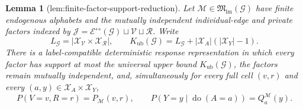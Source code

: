 \documentclass{article}
\newtheorem{lemma}{Lemma}
\begin{document}
\begin{lemma}[lem:finite-factor-support-reduction]\label{lem:finite-factor-support-reduction}
Let \(\mathcal M\in\mathfrak M_{\mathrm{lm}}(\mathcal G)\) have finite endogenous alphabets and the mutually independent individual-edge and private factors indexed by \(\mathcal J=\mathcal E^{\leftrightarrow}(\mathcal G)\sqcup\mathcal V\sqcup\mathcal R\). Write
\[
L_{\mathcal G}=\left|\mathcal X_{\mathcal V}\times\mathcal X_{\mathcal R}\right|,
\qquad
K_{\mathrm{ub}}(\mathcal G)=L_{\mathcal G}+|\mathcal X_A|(|\mathcal X_Y|-1).
\]
There is a label-compatible deterministic response representation in which every factor has support at most the universal upper bound \(K_{\mathrm{ub}}(\mathcal G)\), the factors remain mutually independent, and, simultaneously for every full cell \((v,r)\) and every \((a,y)\in\mathcal X_A\times\mathcal X_Y\),
\[
P(V=v,R=r)=P_{\mathcal M}(v,r),
\qquad
P(Y=y\mid\operatorname{do}(A=a))=Q_a^{\mathcal M}(y).
\]
\end{lemma}
\end{document}
